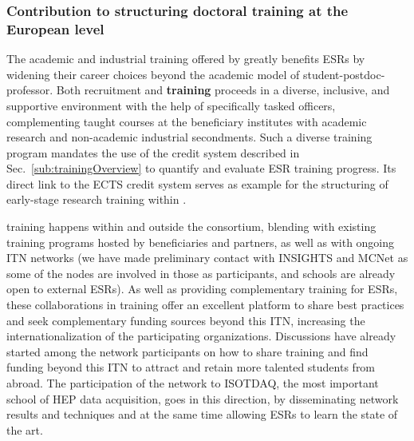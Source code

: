 
\subsubsection{Contribution to structuring doctoral training at the European level}


The academic and industrial training offered by \acronym
greatly benefits ESRs by widening their career choices
beyond the academic model of student-postdoc-professor.
Both \acronym recruitment and \textbf{training} proceeds in a diverse, inclusive, and
supportive environment with the help of specifically tasked officers, complementing
taught courses at the beneficiary institutes with academic research and 
non-academic industrial secondments. 
Such a diverse training program mandates the use of the credit system
described in Sec.~\ref{sub:trainingOverview} to quantify and
evaluate ESR training progress. %
Its direct link to the ECTS credit system serves as example for the 
structuring of early-stage research training within \acronym. 

\acronym training happens within and outside the consortium, 
blending with existing training programs hosted by beneficiaries and partners, as well 
as with ongoing ITN networks (we have made preliminary contact with INSIGHTS and MCNet as some of the nodes are involved
in those as participants, and schools are already open to external ESRs).
As well as providing complementary training for ESRs, 
these collaborations in training offer an excellent platform to share best practices and seek complementary 
funding sources beyond this ITN, increasing the internationalization
of the participating organizations. Discussions have already started among the network participants
on how to share training and find funding beyond this ITN 
to attract and retain more talented students from abroad. The participation of the network
to ISOTDAQ, the most important school of HEP data acquisition, goes in this direction, by 
disseminating network results and techniques and at the same time allowing ESRs to learn the state of the art. 

